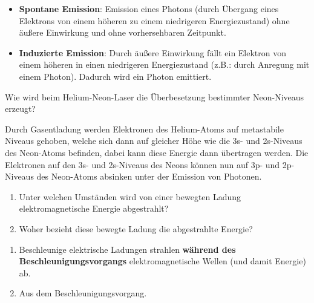 \documentclass[12pt,a4paper,ngerman]{article}
\begin{document}
\begin{itemize}
\item \textbf{Spontane Emission}: Emission eines Photons (durch Übergang eines Elektrons von einem höheren zu einem niedrigeren Energiezustand) ohne äußere Einwirkung und ohne vorhersehbaren Zeitpunkt.
\item \textbf{Induzierte Emission}: Durch äußere Einwirkung fällt ein Elektron von einem höheren in einen niedrigeren Energiezustand (z.B.: durch Anregung mit einem Photon). Dadurch wird ein Photon emittiert. 
\end{itemize}



\begin{framed}
Wie wird beim Helium-Neon-Laser die Überbesetzung bestimmter Neon-Niveaus erzeugt?
\end{framed}

Durch Gasentladung werden Elektronen des Helium-Atoms auf metastabile Niveaus gehoben, welche sich dann auf gleicher Höhe wie die 3s- und 2s-Niveaus des Neon-Atoms befinden, dabei kann diese Energie dann übertragen werden. Die Elektronen auf den 3s- und 2s-Niveaus des Neons können nun auf 3p- und 2p-Niveaus des Neon-Atoms absinken unter der Emission von Photonen. 


\begin{framed}
\begin{enumerate}
\item Unter welchen Umständen wird von einer bewegten Ladung elektromagnetische Energie abgestrahlt?
\item Woher bezieht diese bewegte Ladung die abgestrahlte Energie?
\end{enumerate}
\end{framed}

\begin{enumerate}
\item Beschleunige elektrische Ladungen strahlen \textbf{während des Beschleunigungsvorgangs} elektromagnetische Wellen (und damit Energie) ab.
\item Aus dem Beschleunigungsvorgang. 
\end{enumerate}
\end{document}
